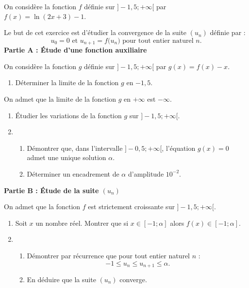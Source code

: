 On considère la fonction $f$ définie sur $]-1,5 ; +\infty[$ par $f(x)=\ln(2x+3)-1$.

\smallskip

Le but de cet exercice est d'étudier la convergence de la suite $\left(u_n\right)$ définie par :%
\[ u_0=0 \text{ et } u_{n+1} = f{\big(u_n\big)} \text{ pour tout entier naturel } n. \]
%
\textbf{Partie A : Étude d'une fonction auxiliaire}

\medskip

On considère la fonction $g$ définie sur $]-1,5 ; +\infty[$ par $g(x) = f (x) - x$.

\begin{enumerate}
	\item Déterminer la limite de la fonction $g$ en $-1,5$.
\end{enumerate}

On admet que la limite de la fonction $g$ en $+\infty$ est $-\infty$.

\begin{enumerate}[resume]
	\item Étudier les variations de la fonction $g$ sur $]-1,5 ; +\infty[$.
	\item 
	\begin{enumerate}
		\item Démontrer que, dans l'intervalle $]-0,5 ; +\infty[$, l'équation $g(x)=0$ admet une unique solution $\alpha$.
		\item Déterminer un encadrement de $\alpha$ d'amplitude $10^{-2}$.
	\end{enumerate}
\end{enumerate}

\textbf{Partie B : Étude de la suite \boldmath$\left(u_n\right)$\unboldmath}

\medskip

On admet que la fonction $f$ est strictement croissante sur $]-1,5 ; +\infty[$.

\begin{enumerate}
	\item Soit $x$ un nombre réel. Montrer que si $x \in [-1;\alpha]$ alors $f(x) \in [-1; \alpha]$.
	\item 
	\begin{enumerate}
		\item Démontrer par récurrence que pour tout entier naturel $n$ : \[ -1 \leqslant u_n \leqslant u_{n+1} \leqslant \alpha. \]
		\item En déduire que la suite $\left(u_n\right)$ converge.
	\end{enumerate}
\end{enumerate}
